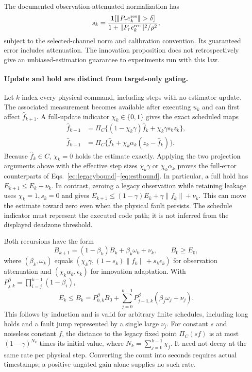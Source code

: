 The documented observation-attenuated normalization has
\[
s_k=\frac{\mathbf{1}[\|P_re_k^{\rm res}\|>\delta]}
{1+\|P_re_k^{\rm res}\|^2/\rho^2},
\]
subject to the selected-channel norm and calibration convention. Its guaranteed error
includes attenuation. The innovation proposition does not retrospectively
give an unbiased-estimation guarantee to experiments run with this law.


\paragraph{Update and hold are distinct from target-only gating.}
Let $k$ index every physical command, including steps with no estimator update.
The associated measurement becomes available after executing $u_k$ and can
first affect $\widehat f_{k+1}$. A full-update indicator $\chi_k\in\{0,1\}$
gives the exact scheduled maps
\begin{align}
\widehat f_{k+1}
 &=\Pi_C\{(1-\chi_k\gamma)\widehat f_k+
                       \chi_k\gamma s_kz_k\},\label{eq:app-scheduled-legacy}\\
\widehat f_{k+1}
 &=\Pi_C\{\widehat f_k+\chi_k\alpha_k(z_k-\widehat f_k)\}.
\label{eq:app-scheduled-innovation}
\end{align}
Because $\widehat f_k\in C$, $\chi_k=0$ holds the estimate exactly.
Applying the two projection arguments above with the effective step sizes
$\chi_k\gamma$ or $\chi_k\alpha_k$ proves
the full-error counterparts of Eqs.~\eqref{eq:legacybound}--\eqref{eq:estbound}. In particular, a full hold
has $E_{k+1}\le E_k+\nu_k$. In contrast, zeroing a legacy observation while
retaining leakage uses $\chi_k=1,s_k=0$ and gives
$E_{k+1}\le(1-\gamma)E_k+\gamma\|f_k\|+\nu_k$.
This can move the estimate toward zero even when the physical fault persists.
The schedule indicator must represent the executed code path; it is not
inferred from the displayed deadzone threshold.

Both recursions have the form
\begin{equation}
 B_{k+1}=(1-\beta_k)B_k+\beta_k\omega_k+\nu_k,\qquad B_0\ge E_0,
 \label{eq:app-schedule-envelope}
\end{equation}
where $(\beta_k,\omega_k)$ equals
$(\chi_k\gamma,(1-s_k)\|f_k\|+s_k\epsilon_k)$ for observation attenuation
and $(\chi_k\alpha_k,\epsilon_k)$ for innovation adaptation.
With $P_{j,k}^{\beta}=\prod_{i=j}^{k-1}(1-\beta_i)$,
\begin{equation}
 E_k\le B_k=P_{0,k}^{\beta}B_0+
 \sum_{j=0}^{k-1}P_{j+1,k}^{\beta}(\beta_j\omega_j+\nu_j).
 \label{eq:app-schedule-product}
\end{equation}
This follows by induction and is valid for arbitrary finite schedules,
including long holds and a fault jump represented by a single large $\nu_j$.
For constant $s$ and noiseless constant $f$, the distance to the legacy
fixed point $\Pi_C(sf)$ is at most $(1-\gamma)^{N_k}$ times its initial
value, where $N_k=\sum_{j=0}^{k-1}\chi_j$. It need not decay
at the same rate per physical step. Converting the count into seconds requires
actual timestamps; a positive ungated gain alone supplies no such rate.

